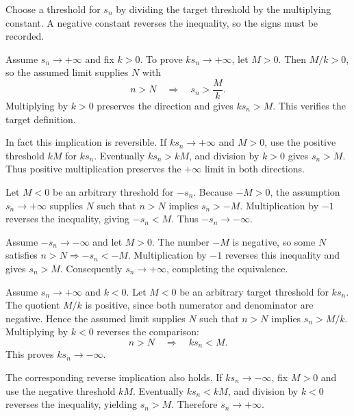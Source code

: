 \idea Choose a threshold for $s_n$ by dividing the target
threshold by the multiplying constant. A negative constant
reverses the inequality, so the signs must be recorded.

Assume $s_n\to+\infty$ and fix $k>0$.
To prove $ks_n\to+\infty$, let $M>0$. Then $M/k>0$,
so the assumed limit supplies $N$ with
\[
 n>N\quad\Longrightarrow\quad s_n>\frac Mk.
\]
Multiplying by $k>0$ preserves the direction and gives
$ks_n>M$. This verifies the target definition.

In fact this implication is reversible. If $ks_n\to+\infty$
and $M>0$, use the positive threshold $kM$ for $ks_n$.
Eventually $ks_n>kM$, and division by $k>0$ gives $s_n>M$.
Thus positive multiplication preserves the $+\infty$ limit in
both directions.

Let $M<0$ be an arbitrary threshold for $-s_n$.
Because $-M>0$, the assumption $s_n\to+\infty$ supplies
$N$ such that $n>N$ implies $s_n>-M$.
Multiplication by $-1$ reverses the inequality, giving
$-s_n<M$. Thus $-s_n\to-\infty$.

Assume $-s_n\to-\infty$ and let $M>0$.
The number $-M$ is negative, so some $N$ satisfies
$n>N\Longrightarrow -s_n<-M$. Multiplication by $-1$
reverses this inequality and gives $s_n>M$.
Consequently $s_n\to+\infty$, completing the equivalence.

Assume $s_n\to+\infty$ and $k<0$. Let $M<0$ be
an arbitrary target threshold for $ks_n$. The quotient
$M/k$ is positive, since both numerator and denominator are
negative. Hence the assumed limit supplies $N$ such that
$n>N$ implies $s_n>M/k$. Multiplying by $k<0$ reverses
the comparison:
\[
 n>N\quad\Longrightarrow\quad ks_n<M.
\]
This proves $ks_n\to-\infty$.

The corresponding reverse implication also holds. If
$ks_n\to-\infty$, fix $M>0$ and use the negative threshold
$kM$. Eventually $ks_n<kM$, and division by $k<0$ reverses
the inequality, yielding $s_n>M$. Therefore $s_n\to+\infty$.



